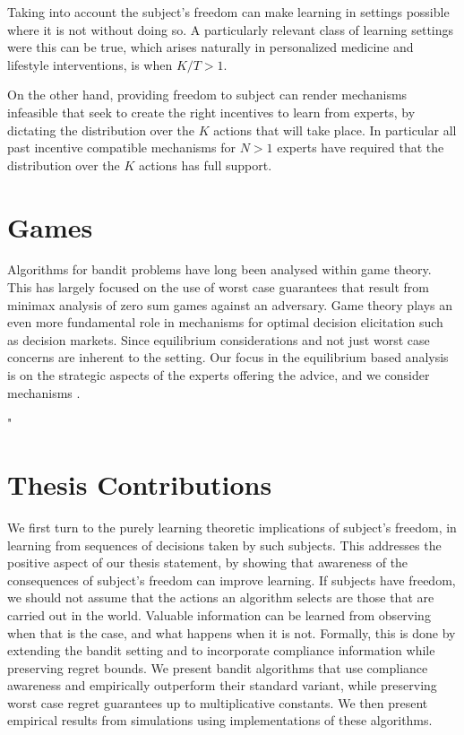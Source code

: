 Taking into account the subject's freedom can make learning in settings possible where it is not without doing so.
A particularly relevant class of learning settings were this can be true, which arises naturally in personalized medicine and lifestyle interventions, is when $K/T > 1$.

On the other hand, providing freedom to subject can render mechanisms infeasible that seek to create the right incentives to learn from experts, by dictating the distribution over the $K$ actions that will take place.
In particular all past incentive compatible mechanisms for $N>1$ experts have required that the distribution over the $K$ actions has full support.


\section{Games}

Algorithms for bandit problems have long been analysed within game theory.
This has largely focused on the use of worst case guarantees that result from minimax analysis of zero sum games against an adversary.
Game theory plays an even more fundamental role in mechanisms for optimal decision elicitation such as decision markets.
Since equilibrium considerations and not just worst case concerns are inherent to the setting.
Our focus in the equilibrium based analysis is on the strategic aspects of the experts offering the advice, and we consider mechanisms .


"%

\section{Thesis Contributions}

We first turn to the purely learning theoretic implications of subject's freedom, in learning from sequences of decisions taken by such subjects.
This addresses the positive aspect of our thesis statement, by showing that awareness of the consequences of subject's freedom can improve learning.
If subjects have freedom, we should not assume that the actions an algorithm selects are those that are carried out in the world.
Valuable information can be learned from observing when that is the case, and what happens when it is not.
Formally, this is done by extending the bandit setting and to incorporate compliance information while preserving regret bounds. 
We present bandit algorithms that use compliance awareness and empirically outperform their standard variant, while preserving worst case regret guarantees up to multiplicative constants.
We then present empirical results from simulations using implementations of these algorithms.

